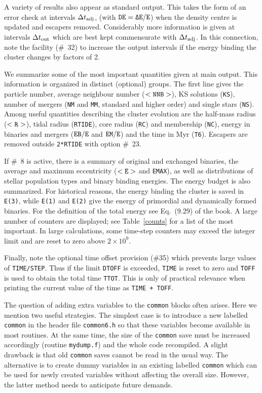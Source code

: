 \documentclass[12pt]{article}
\begin{document}
A variety of results also appear as standard output.
This takes the form of an error check at intervals ${\Delta t}_{\rm adj}$,
(with ${\tt DE = \Delta E/E}$) when the density centre is updated and
escapers removed.
Considerably more information is given at intervals ${\Delta t}_{\rm out}$
which are best kept commensurate with ${\Delta t}_{\rm adj}$.
In this connection, note the facility (\#~32) to increase the output
intervals if the energy binding the cluster changes by factors of 2.

We summarize some of the most important quantities given at main output.
This information is organized in distinct (optional) groups.
The first line gives the particle number, average neighbour number
($<{\tt NNB}>$), KS solutions ({\tt KS}), number of mergers ({\tt NM} and
{\tt MM}, standard and higher order) and single stars ({\tt NS}).
Among useful quantities describing the cluster evolution are the half-mass
radius ($<{\tt R>}$), tidal radius ({\tt RTIDE}), core radius ({\tt RC}) and
membership ({\tt NC}), energy in binaries and mergers
(${\tt EB/E}$ and ${\tt EM/E}$) and the time in Myr ({\tt T6}).
Escapers are removed outside {\tt 2*RTIDE} with option \#~23.

If \#~8 is active, there is a summary of original and exchanged binaries, the
average and maximum eccentricity ($<{\tt E>}$ and {\tt EMAX}), as well as
distributions of stellar population types and binary binding energies.
The energy budget is also summarized.
For historical reasons, the energy binding the cluster is saved in
{\tt E(3)}, while {\tt E(1)} and {\tt E(2)} give the energy of primordial
and dynamically formed binaries.
For the definition of the total energy see Eq.~(9.29) of the book.
A large number of counters are displayed; see Table~\ref{counts} for a list
of the most important.
In large calculations, some time-step counters may exceed the integer limit
and are reset to zero above $2 \times 10^9$.

Finally, note the optional time offset provision (\#35) which prevents large
values of {\tt TIME/STEP}.
Thus if the limit {\tt DTOFF} is exceeded, {\tt TIME} is reset to zero and
{\tt TOFF} is used to obtain the total time {\tt TTOT}.
This is only of practical relevance when printing the current value of the
time as {\tt TIME + TOFF}.

The question of adding extra variables to the {\tt common} blocks often
arises.
Here we mention two useful strategies.
The simplest case is to introduce a new labelled {\tt common} in the header
file {\tt common6.h} so that these variables become available in most
routines.
At the same time, the size of the {\tt common} save must be increased
accordingly (\cf routine {\tt mydump.f}) and the whole code recompiled.
A slight drawback is that old {\tt common} saves cannot be read in the
usual way.
The alternative is to create dummy variables in an existing labelled
{\tt common} which can be used for newly created variables without affecting
the overall size.
However, the latter method needs to anticipate future demands.
\end{document}
